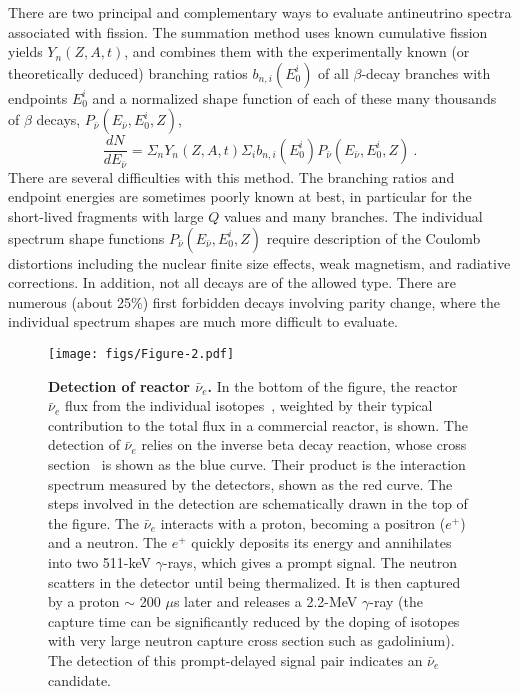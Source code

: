 \documentclass[aps,twocolumn,preprintnumbers,amsmath,superscriptaddress,amssymb,floats,nofootinbib]{revtex4-1}
\begin{document}
There are two principal and complementary ways to evaluate antineutrino spectra associated with fission. 
 The summation method uses known cumulative fission yields $Y_n (Z,A,t)$, and combines them
 with the experimentally known (or theoretically deduced) branching ratios $b_{n,i}(E^i_0)$ of all $\beta$-decay branches with endpoints $E^i_0$ and a
 normalized shape function of each of these many thousands of $\beta$ decays, $P_{\bar{\nu}} (E_{\bar{\nu}},E^i_0,Z)$,
 \begin{equation}
 \frac{dN}{dE_{\bar{\nu}}} = \Sigma_n Y_n (Z,A,t) \Sigma_i b_{n,i}(E^i_0) P_{\bar{\nu}} (E_{\bar{\nu}},E^i_0,Z) ~.
 \end{equation}
 There are several difficulties with this method. The branching ratios and endpoint energies are sometimes poorly known at best, in particular for
 the short-lived fragments with large $Q$ values and many branches. The individual spectrum shape functions $P_{\bar{\nu}} (E_{\bar{\nu}},E^i_0,Z)$
 require description of the Coulomb distortions including the nuclear finite size effects, weak magnetism, and radiative corrections. In addition, not all
 decays are of the allowed type. There are numerous (about 25\%) first forbidden decays involving parity change, where the individual spectrum 
 shapes are much more difficult to evaluate. 
 
 \begin{figure}[tb]
 \begin{centering}
 \texttt{[image: figs/Figure-2.pdf]}
 \par\end{centering}
 \caption{\label{fig:spectra} {\bf Detection of reactor $\bar{\nu}_e$.} In the bottom of the figure, the reactor $\bar{\nu}_e$ flux from the individual isotopes~\cite{Huber,Mueller}, weighted by their typical contribution to the total flux in a commercial reactor, is shown. The detection of $\bar{\nu}_e$ relies on the inverse beta decay reaction, whose cross section~\cite{VB99, Strumia} is shown as the blue curve. Their product is the interaction spectrum measured by the detectors, shown as the red curve. 
 The steps involved in the detection are schematically drawn in the top of the figure. The $\bar{\nu}_e$ interacts with a proton, becoming a positron ($e^+$) and a neutron. The $e^+$ quickly deposits its energy and annihilates into two 511-keV $\gamma$-rays, which gives a prompt signal. The neutron scatters in the detector until being thermalized. It is then captured by a proton $\sim$ 200 $\mu$s later and releases a 2.2-MeV $\gamma$-ray (the capture time can be significantly reduced by the doping of isotopes
with very large neutron capture cross section such as gadolinium). The detection of this prompt-delayed signal pair indicates an $\bar{\nu}_e$ candidate.}
 \end{figure}
 
\end{document}
